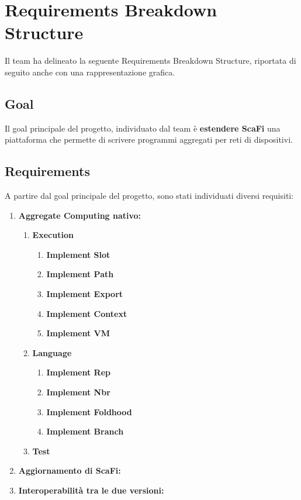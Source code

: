 \documentclass[12pt, a4paper]{article}
\begin{document}
\section*{Requirements Breakdown Structure}

Il team ha delineato la seguente Requirements Breakdown Structure, riportata di seguito anche con una 
rappresentazione grafica.

\subsection*{Goal}

Il goal principale del progetto, individuato dal team è \textbf{estendere ScaFi } una piattaforma che permette
di scrivere programmi aggregati per reti di dispositivi.

\subsection*{Requirements}

A partire dal goal principale del progetto, sono stati individuati diversi requisiti:

\begin{enumerate}
    \item \textbf{Aggregate Computing nativo:}
        \begin{enumerate}
            \item \textbf{Execution}
                \begin{enumerate}
                    \item \textbf{Implement Slot}
                    \item \textbf{Implement Path}
                    \item \textbf{Implement Export}
                    \item \textbf{Implement Context}
                    \item \textbf{Implement VM}
                \end{enumerate}

            \item \textbf{Language}
                \begin{enumerate}
                    \item \textbf{Implement Rep}
                    \item \textbf{Implement Nbr}
                    \item \textbf{Implement Foldhood}
                    \item \textbf{Implement Branch}
                \end{enumerate}

            \item \textbf{Test}
        \end{enumerate}

    \item \textbf{Aggiornamento di ScaFi:}

    \item \textbf{Interoperabilità tra le due versioni:}
\end{enumerate}
\end{document}
